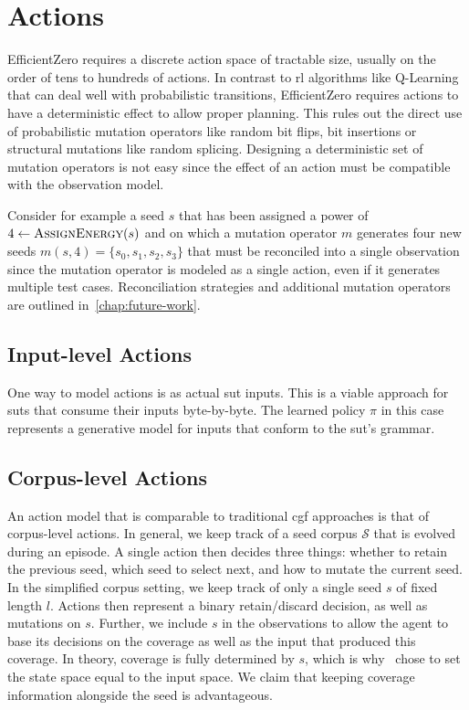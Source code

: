 
\section{Actions}\label{sec:mdp-actions}

EfficientZero requires a discrete action space of tractable size, usually on the
order of tens to hundreds of actions.
In contrast to \gls{rl} algorithms like Q-Learning that can deal well with probabilistic
transitions, EfficientZero requires actions to have a deterministic effect to allow proper planning.
This rules out the direct use of probabilistic mutation operators like random
bit flips, bit insertions or structural mutations like random splicing.
Designing a deterministic set of mutation operators is not easy since the effect
of an action must be compatible with the observation model.

Consider for example a seed $s$ that has been assigned a power of
$4\leftarrow\textsc{AssignEnergy}(s)$ and on which a
mutation operator $m$ generates four new seeds $m(s,4)=\{s_0,s_1,s_2,s_3\}$
that must be reconciled into a single observation since the mutation operator is modeled
as a single action, even if it generates multiple test cases.
Reconciliation strategies and additional mutation operators are outlined in~\cref{chap:future-work}.

\subsection{Input-level Actions}\label{sec:input-level-actions}

One way to model actions is as actual \gls{sut} inputs.
This is a viable approach for \glspl{sut} that consume their inputs byte-by-byte.
The learned policy $\pi$ in this case represents a generative model for inputs
that conform to the \gls{sut}'s grammar.

\subsection{Corpus-level Actions}\label{sec:corpus-level-actions}

An action model that is comparable to traditional \gls{cgf} approaches is that of
corpus-level actions.
In general, we keep track of a seed corpus $\mathcal{S}$ that is evolved during an episode.
A single action then decides three things: whether to retain the previous seed,
which seed to select next, and how to mutate the current seed.
In the simplified corpus setting, we keep track of only a single seed $s$ of fixed length $l$.
Actions then represent a binary retain/discard decision, as well as mutations on $s$.
Further, we include $s$ in the observations to allow the agent to base its decisions
on the coverage as well as the input that produced this coverage.
In theory, coverage is fully determined by $s$, which is why~\textcite{bottinger_deep_2018}
chose to set the state space equal to the input space.
We claim that keeping coverage information alongside the seed is advantageous.

